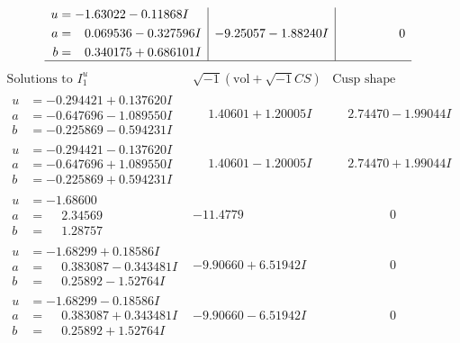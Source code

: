 \documentclass[1p]{elsarticle_modified}
\theoremstyle{definition}
\newcommand{\I}{\sqrt{-1}}
\begin{document}
$$\begin{array}{c|c|c}
\begin{aligned}
u &= -1.63022 - 0.11868 I \\
a &= \phantom{-}0.069536 - 0.327596 I \\
b &= \phantom{-}0.340175 + 0.686101 I\end{aligned}
 & -9.25057 - 1.88240 I & \phantom{-0.000000 } 0\\
 \hline 
 \end{array}$$\newpage$$\begin{array}{c|c|c}  
\text{Solutions to }I^u_{1}& \I (\text{vol} + \sqrt{-1}CS) & \text{Cusp shape}\\
 \hline 
\begin{aligned}
u &= -0.294421 + 0.137620 I \\
a &= -0.647696 - 1.089550 I \\
b &= -0.225869 - 0.594231 I\end{aligned}
 & \phantom{-}1.40601 + 1.20005 I & \phantom{-}2.74470 - 1.99044 I \\ \hline\begin{aligned}
u &= -0.294421 - 0.137620 I \\
a &= -0.647696 + 1.089550 I \\
b &= -0.225869 + 0.594231 I\end{aligned}
 & \phantom{-}1.40601 - 1.20005 I & \phantom{-}2.74470 + 1.99044 I \\ \hline\begin{aligned}
u &= -1.68600\phantom{ +0.000000I} \\
a &= \phantom{-}2.34569\phantom{ +0.000000I} \\
b &= \phantom{-}1.28757\phantom{ +0.000000I}\end{aligned}
 & -11.4779\phantom{ +0.000000I} & \phantom{-0.000000 } 0 \\ \hline\begin{aligned}
u &= -1.68299 + 0.18586 I \\
a &= \phantom{-}0.383087 - 0.343481 I \\
b &= \phantom{-}0.25892 - 1.52764 I\end{aligned}
 & -9.90660 + 6.51942 I & \phantom{-0.000000 } 0 \\ \hline\begin{aligned}
u &= -1.68299 - 0.18586 I \\
a &= \phantom{-}0.383087 + 0.343481 I \\
b &= \phantom{-}0.25892 + 1.52764 I\end{aligned}
 & -9.90660 - 6.51942 I & \phantom{-0.000000 } 0 \\ \hline\begin{aligned}

\end{aligned}
\end{array}$$
\end{document}
